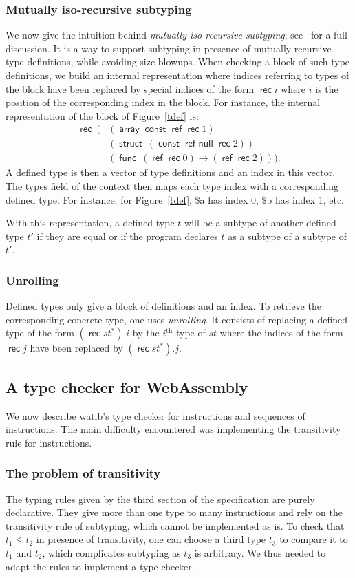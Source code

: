 \documentclass[a4paper,11pt]{article}
\DeclareMathOperator{\reft}{\textsf{ref}}
\DeclareMathOperator{\rect}{\textsf{rec}}
\DeclareMathOperator{\strt}{\textsf{struct}}
\DeclareMathOperator{\arrt}{\textsf{array}}
\DeclareMathOperator{\funt}{\textsf{func}}
\DeclareMathOperator{\cstt}{\textsf{const}}
\DeclareMathOperator{\refnullt}{\textsf{ref null}}
\begin{document}
\subsubsection{Mutually iso-recursive subtyping}\label{deft}
We now give the intuition behind \emph{mutually iso-recursive subtyping};
see~\cite{rossberg2023mutually} for a full discussion. It is a way to support
subtyping in presence of mutually recursive type definitions, while avoiding
size blowups. When checking a block of such type definitions, we build an
internal representation where indices referring to types of the block have been
replaced by special indices of the form $\rect i$ where $i$ is the position of
the corresponding index in the block. For instance, the internal representation of the block
of Figure~\ref{tdef} is:
\begin{align*}
\rect\ (& (\arrt \cstt\reft \rect 1)\\
&(\strt\ (\cstt \refnullt \rect 2))\\
&(\funt\ (\reft \rect 0)\to (\reft \rect 2))).
\end{align*}
A defined type is then a vector of type definitions and an index in this vector.
The \textsf{types} field of the context then maps each type index with a
corresponding defined type. For instance, for Figure~\ref{tdef}, \textsf{\$a}
has index 0, \textsf{\$b} has index 1, etc.

With this representation, a defined type $t$ will be a subtype of another
defined type $t'$ if they are equal or if the program declares $t$ as a subtype
of a subtype of $t'$.

\subsubsection{Unrolling}
Defined types only give a block of definitions and an index. To retrieve the
corresponding concrete type, one uses \emph{unrolling}. It consists of replacing
a defined type of the form $(\rect st^*).i$ by the $i^{\text{th}}$ type of $st$
where the indices of the form $\rect j$ have been replaced by $(\rect st^*).j$.

\subsection{A type checker for WebAssembly}\label{algo}
We now describe \textsf{watib}'s type checker for instructions and sequences of
instructions. The main difficulty encountered was implementing the transitivity
rule for instructions.
\subsubsection{The problem of transitivity}
The typing rules given by the third section of the specification are purely
declarative. They give more than one type to many instructions and rely on the
transitivity rule of subtyping, which cannot be implemented as is. To check that
$t_1 \leq t_2$ in presence of transitivity, one can choose a third type $t_3$ to
compare it to $t_1$ and $t_2$, which complicates subtyping as $t_3$ is
arbitrary. We thus needed to adapt the rules to implement a type checker.
\end{document}
